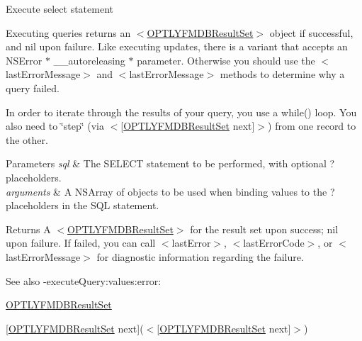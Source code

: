 Execute select statement

Executing queries returns an {\ttfamily $<$\mbox{\hyperlink{interface_o_p_t_l_y_f_m_d_b_result_set}{O\+P\+T\+L\+Y\+F\+M\+D\+B\+Result\+Set}}$>$} object if successful, and {\ttfamily nil} upon failure. Like executing updates, there is a variant that accepts an {\ttfamily N\+S\+Error $\ast$ \+\_\+\+\_\+autoreleasing $\ast$} parameter. Otherwise you should use the {\ttfamily $<$last\+Error\+Message$>$} and {\ttfamily $<$last\+Error\+Message$>$} methods to determine why a query failed.

In order to iterate through the results of your query, you use a {\ttfamily while()} loop. You also need to \char`\"{}step\char`\"{} (via {\ttfamily $<$\mbox{[}\mbox{\hyperlink{interface_o_p_t_l_y_f_m_d_b_result_set}{O\+P\+T\+L\+Y\+F\+M\+D\+B\+Result\+Set}} next\mbox{]}$>$}) from one record to the other.


\begin{DoxyParams}{Parameters}
{\em sql} & The S\+E\+L\+E\+CT statement to be performed, with optional {\ttfamily ?} placeholders.\\
\hline
{\em arguments} & A {\ttfamily N\+S\+Array} of objects to be used when binding values to the {\ttfamily ?} placeholders in the S\+QL statement.\\
\hline
\end{DoxyParams}
\begin{DoxyReturn}{Returns}
A {\ttfamily $<$\mbox{\hyperlink{interface_o_p_t_l_y_f_m_d_b_result_set}{O\+P\+T\+L\+Y\+F\+M\+D\+B\+Result\+Set}}$>$} for the result set upon success; {\ttfamily nil} upon failure. If failed, you can call {\ttfamily $<$last\+Error$>$}, {\ttfamily $<$last\+Error\+Code$>$}, or {\ttfamily $<$last\+Error\+Message$>$} for diagnostic information regarding the failure.
\end{DoxyReturn}
\begin{DoxySeeAlso}{See also}
-\/execute\+Query\+:values\+:error\+: 

\mbox{\hyperlink{interface_o_p_t_l_y_f_m_d_b_result_set}{O\+P\+T\+L\+Y\+F\+M\+D\+B\+Result\+Set}} 

\mbox{[}{\ttfamily \mbox{\hyperlink{interface_o_p_t_l_y_f_m_d_b_result_set}{O\+P\+T\+L\+Y\+F\+M\+D\+B\+Result\+Set}} next}\mbox{]}($<$\mbox{[}\mbox{\hyperlink{interface_o_p_t_l_y_f_m_d_b_result_set}{O\+P\+T\+L\+Y\+F\+M\+D\+B\+Result\+Set}} next\mbox{]}$>$) 
\end{DoxySeeAlso}
\mbox{\label{interface_o_p_t_l_y_f_m_d_b_database_a21ab2761ffb8dbae2a6ef70106010122}} 
